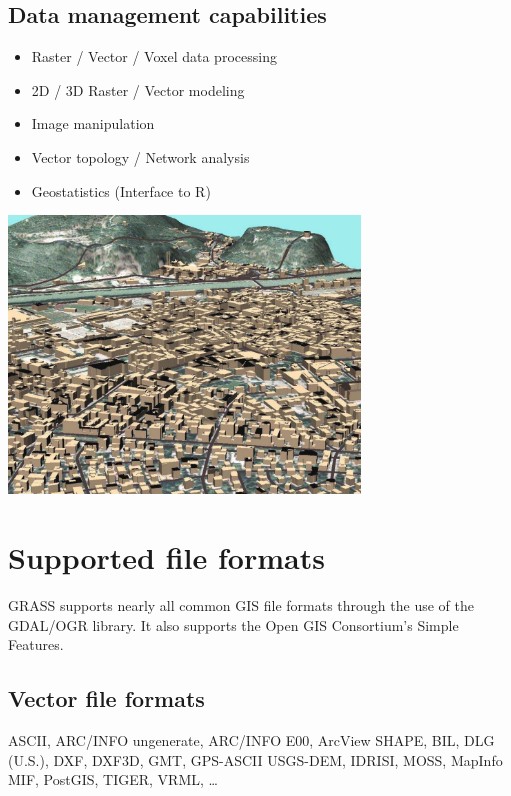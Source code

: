 \documentclass[notumble,a4paper,10pt,nofoldmark]{leaflet}
\newenvironment{myfig}[1][0pt plus 1.5ex minus .5ex]{\par\vspace*{#1}\begin{minipage}{\textwidth}\centering}{\end{minipage}}
\begin{document}
\subsection{Data management capabilities}

\begin{itemize}
\item Raster / Vector / Voxel data processing
\item 2D / 3D Raster / Vector modeling
\item Image manipulation
\item Vector topology / Network analysis
\item Geostatistics (Interface to R)
\end{itemize}

\begin{myfig}[1ex]
\includegraphics[width=0.7\textwidth]{trento3d}
\end{myfig}

\section{Supported file formats}

GRASS supports nearly all common GIS file formats through the use of the GDAL/OGR library. It also supports the Open GIS Consortium's Simple Features.

\subsection{Vector file formats}
ASCII, ARC/INFO ungenerate, ARC/INFO E00, Arc\-View SHAPE, BIL, DLG (U.S.), DXF, DXF3D, GMT, GPS-ASCII USGS-DEM, IDRISI, MOSS, MapInfo MIF, PostGIS, TIGER, VRML, \dots
\end{document}
